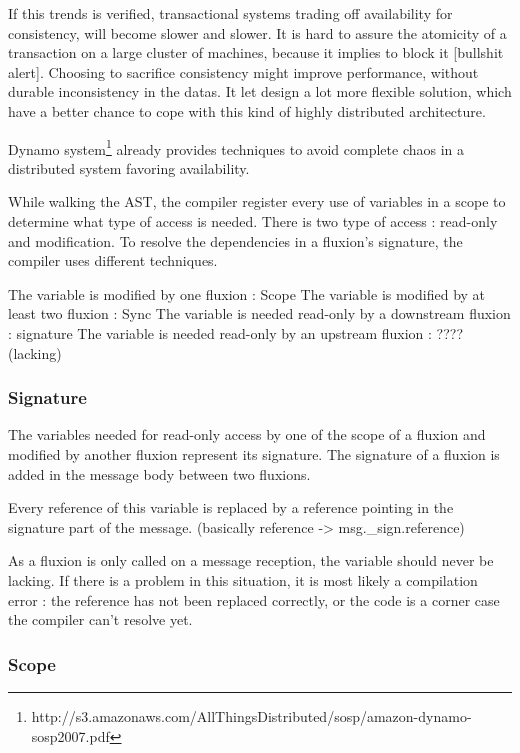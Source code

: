 If this trends is verified, transactional systems trading off availability for consistency, will become slower and slower.
It is hard to assure the atomicity of a transaction on a large cluster of machines, because it implies to block it [bullshit alert].
Choosing to sacrifice consistency might improve performance, without durable inconsistency in the datas.
It let design a lot more flexible solution, which have a better chance to cope with this kind of highly distributed architecture.


Dynamo system\footnote{http://s3.amazonaws.com/AllThingsDistributed/sosp/amazon-dynamo-sosp2007.pdf} already provides techniques to avoid complete chaos in a distributed system favoring availability.





While walking the AST, the compiler register every use of variables in a scope to determine what type of access is needed.
There is two type of access : read-only and modification.
To resolve the dependencies in a fluxion's signature, the compiler uses different techniques.

The variable is modified by one fluxion : Scope
The variable is modified by at least two fluxion : Sync
The variable is needed read-only by a downstream fluxion : signature
The variable is needed read-only by an upstream fluxion : ???? (lacking)


\subsubsection{Signature}

  The variables needed for read-only access by one of the scope of a fluxion and modified by another fluxion represent its signature.
  The signature of a fluxion is added in the message body between two fluxions.

  Every reference of this variable is replaced by a reference pointing in the signature part of the message.
  (basically reference -> msg.\_sign.reference)

  As a fluxion is only called on a message reception, the variable should never be lacking.
  If there is a problem in this situation, it is most likely a compilation error : the reference has not been replaced correctly, or the code is a corner case the compiler can't resolve yet.

\subsubsection{Scope}

